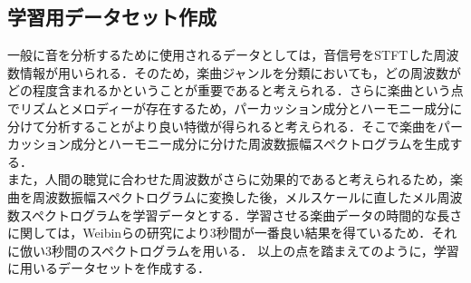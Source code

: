 \begin{table}[htbp]
	\begin{center}
		\caption{ジャンル毎のデータセット数}
		\label{tab:gtzan}
	\end{center}
\end{table}


\subsection{学習用データセット作成}
一般に音を分析するために使用されるデータとしては，音信号をSTFTした周波数情報が用いられる．そのため，楽曲ジャンルを分類においても，どの周波数がどの程度含まれるかということが重要であると考えられる．さらに楽曲という点でリズムとメロディーが存在するため，パーカッション成分とハーモニー成分に分けて分析することがより良い特徴が得られると考えられる．そこで楽曲をパーカッション成分とハーモニー成分に分けた周波数振幅スペクトログラムを生成する\cite{percuss_harmony}．\\
また，人間の聴覚に合わせた周波数がさらに効果的であると考えられるため，楽曲を周波数振幅スペクトログラムに変換した後，メルスケールに直したメル周波数スペクトログラムを学習データとする．学習させる楽曲データの時間的な長さに関しては，Weibinらの研究により3秒間が一番良い結果を得ているため．それに倣い3秒間のスペクトログラムを用いる\cite{weibin}．
以上の点を踏まえてのように，学習に用いるデータセットを作成する．

